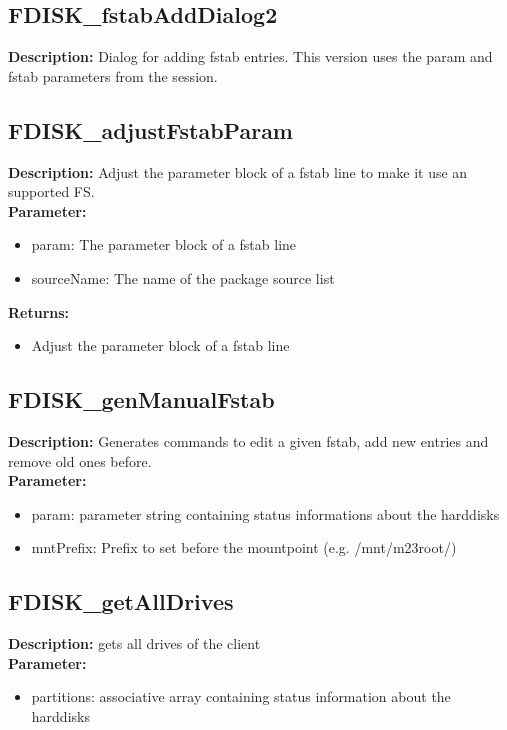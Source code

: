 \subsection{FDISK\_fstabAddDialog2}
\textbf{Description:} Dialog for adding fstab entries. This version uses the param and fstab parameters from the session.\\

\subsection{FDISK\_adjustFstabParam}
\textbf{Description:} Adjust the parameter block of a fstab line to make it use an supported FS.\\
\textbf{Parameter:}
\begin{itemize}
\item param: The parameter block of a fstab line
\item sourceName: The name of the package source list
\end{itemize}
\textbf{Returns:}
\begin{itemize}
\item Adjust the parameter block of a fstab line
\end{itemize}

\subsection{FDISK\_genManualFstab}
\textbf{Description:} Generates commands to edit a given fstab, add new entries and remove old ones before.\\
\textbf{Parameter:}
\begin{itemize}
\item param: parameter string containing status informations about the harddisks
\item mntPrefix: Prefix to set before the mountpoint (e.g. /mnt/m23root/)
\end{itemize}

\subsection{FDISK\_getAllDrives}
\textbf{Description:} gets all drives of the client\\
\textbf{Parameter:}
\begin{itemize}
\item partitions: associative array containing status information about the harddisks
\end{itemize}

